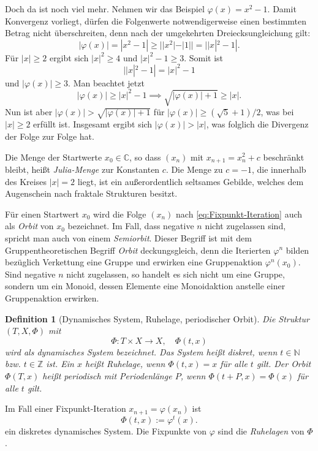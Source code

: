 \documentclass[a4paper,11pt,fleqn,twoside]{scrartcl}
\numberwithin{equation}{section}
\newcommand{\N}{\mathbb N}
\newcommand{\Z}{\mathbb Z}
\newcommand{\C}{\mathbb C}
\theoremstyle{rmbox}
\newtheorem{Definition}{Definition}
\begin{document}
Doch da ist noch viel mehr. Nehmen wir das Beispiel
$\varphi(x)=x^2-1$. Damit Konvergenz vorliegt, dürfen die Folgenwerte
notwendigerweise einen bestimmten Betrag nicht überschreiten, denn
nach der umgekehrten Dreiecksungleichung gilt:
\begin{equation}
|\varphi(x)| = |x^2-1| \ge ||x^2|-|1|| = ||x|^2-1|.
\end{equation}
Für $|x|\ge 2$ ergibt sich $|x|^2\ge 4$ und $|x|^2-1\ge 3$.
Somit ist
\begin{equation}
||x|^2-1| = |x|^2-1
\end{equation}
und $|\varphi(x)|\ge 3$.
Man beachtet jetzt
\begin{equation}
|\varphi(x)|\ge |x|^2-1 \implies \sqrt{|\varphi(x)|+1}\ge |x|.
\end{equation}
Nun ist aber $|\varphi(x)|>\sqrt{|\varphi(x)|+1}$ für
$|\varphi(x)|\ge (\sqrt{5}+1)/2$, was bei $|x|\ge 2$ erfüllt ist.
Insgesamt ergibt sich $|\varphi(x)|>|x|$, was folglich die Divergenz
der Folge zur Folge hat.

Die Menge der Startwerte $x_0\in\C$, so dass
$(x_n)$ mit $x_{n+1}=x_n^2+c$ beschränkt bleibt,
heißt \emph{Julia-Menge} zur Konstanten $c$. Die Menge zu $c=-1$,
die innerhalb des Kreises $|x|=2$ liegt, ist ein außerordentlich
seltsames Gebilde, welches dem Augenschein nach
fraktale Strukturen besitzt.

Für einen Startwert $x_0$ wird die Folge $(x_n)$ nach
\eqref{eq:Fixpunkt-Iteration} auch als \emph{Orbit}
von $x_0$ bezeichnet. Im Fall, dass negative $n$ nicht zugelassen
sind, spricht man auch von einem \emph{Semiorbit}. Dieser Begriff
ist mit dem Gruppentheoretischen Begriff \emph{Orbit} deckungsgleich,
denn die Iterierten $\varphi^n$ bilden bezüglich Verkettung
eine Gruppe und erwirken eine Gruppenaktion $\varphi^n(x_0)$.
Sind negative $n$ nicht zugelassen,
so handelt es sich nicht um eine Gruppe, sondern um ein Monoid,
dessen Elemente eine Monoidaktion anstelle einer Gruppenaktion
erwirken.

\begin{Definition}[Dynamisches System, Ruhelage, periodischer Orbit]
Die Struktur $(T,X,\Phi)$ mit
\begin{equation}
\Phi\colon T\times X\to X,\quad\Phi(t,x)
\end{equation}
wird als \emph{dynamisches System} bezeichnet. Das System heißt
\emph{diskret}, wenn $t\in\N$ bzw. $t\in\Z$ ist. Ein $x$ heißt
\emph{Ruhelage}, wenn $\Phi(t,x)=x$ für alle $t$ gilt. Der Orbit $\Phi(T,x)$
heißt \emph{periodisch} mit Periodenlänge $P$, wenn $\Phi(t+P,x)=\Phi(x)$
für alle $t$ gilt. 
\end{Definition}
Im Fall einer Fixpunkt-Iteration $x_{n+1}=\varphi(x_n)$ ist
\begin{equation}
\Phi(t,x):=\varphi^t(x).
\end{equation}
ein diskretes dynamisches System. Die Fixpunkte von $\varphi$ sind
die \emph{Ruhelagen} von $\Phi$.
\end{document}
